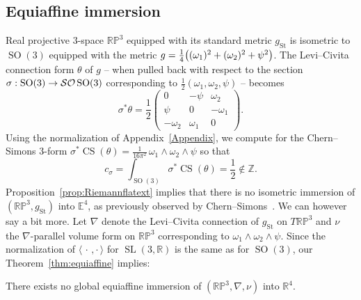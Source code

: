\documentclass[AHL,Unicode,longabstracts]{cedram}
\newcommand{\B}[2]{\langle#1,#2\rangle}
\DeclareMathOperator{\CS}{CS}
\DeclareMathOperator{\SO}{SO}
\DeclareMathOperator{\SL}{SL}
\DeclareMathOperator{\St}{St}
\newcommand*{\R}{\mathbb{R}}
\newcommand*{\bbRP}{\mathbb{RP}}
\newcommand*{\bbE}{\mathbb{E}}
\newcommand{\Z}{\mathbb{Z}}
\newcommand{\clSO}{\mathcal{SO}}
\renewcommand*{\to}{\mathchoice{\longrightarrow}{\rightarrow}{\rightarrow}{\rightarrow}}
\let\originalleft\left
\let\originalright\right
\renewcommand{\left}{\mathopen{}\mathclose\bgroup\originalleft}
\renewcommand{\right}{\aftergroup\egroup\originalright}
\newcommand*{\R}{\mathbb{R}}
\begin{document}
\subsection{Equiaffine immersion}

Real projective $3$-space $\bbRP^3$ equipped with its standard metric $g_{\St}$ is isometric to $\SO(3)$ equipped with the metric $g=\frac{1}{4}\left((\omega_1)^2+(\omega_2)^2+\psi^2\right)$. The Levi--Civita connection form $\theta$ of $g$ -- when pulled back with respect to the section $\sigma : \SO(3) \to \clSO \SO(3)$ corresponding to $\frac{1}{2}(\omega_1,\omega_2,\psi)$ -- becomes
\[
\sigma^*\theta=\frac{1}{2}
\begin{pmatrix}
0 & -\psi & \omega_2 \\
\psi & 0 & -\omega_1 \\
-\omega_2 & \omega_1 & 0
\end{pmatrix}.
\]
Using the normalization of Appendix~\ref{Appendix}, we compute for the Chern--Simons $3$-form $\sigma^*\CS(\theta)=\frac{1}{16\pi^2}\,\omega_1\wedge\omega_2\wedge\psi$ so that
\[
c_{\sigma}=\int_{\SO(3)}\sigma^*\CS(\theta)=\frac{1}{2} \notin \Z.
\]
Proposition~\ref{prop:Riemannflatext} implies that there is no isometric immersion of $(\bbRP^3,g_{\St})$ into $\bbE^4$, as previously observed by Chern--Simons~\cite{MR0353327}. We can however say a bit more. Let $\nabla$ denote the Levi--Civita connection of $g_{\St}$ on $T\bbRP^3$ and $\nu$ the $\nabla$-parallel volume form on $\bbRP^3$ corresponding to $\omega_1\wedge\omega_2\wedge\psi$. Since the normalization of $\B{\,\cdot\,}{\cdot\,}$ for $\SL(3,\R)$ is the same as for $\SO(3)$, our Theorem~\ref{thm:equiaffine} implies:
\begin{prop}
There exists no global equiaffine immersion of $(\bbRP^3,\nabla,\nu)$ into $\R^4$.
\end{prop}



\end{document}
